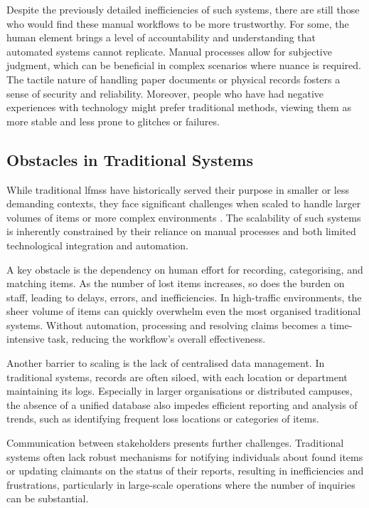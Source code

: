 Despite the previously detailed inefficiencies of such systems, there are still those who would find these manual workflows to be more trustworthy. For some, the human element brings a level of accountability and understanding that automated systems cannot replicate. Manual processes allow for subjective judgment, which can be beneficial in complex scenarios where nuance is required. The tactile nature of handling paper documents or physical records fosters a sense of security and reliability. Moreover, people who have had negative experiences with technology might prefer traditional methods, viewing them as more stable and less prone to glitches or failures.


\subsection{Obstacles in Traditional Systems} \label{subsec:obstacles-traditional-systems}

While traditional \acp{lfms} have historically served their purpose in smaller or less demanding contexts, they face significant challenges when scaled to handle larger volumes of items or more complex environments \cite{Mayura2024}. The scalability of such systems is inherently constrained by their reliance on manual processes and both limited technological integration and automation.

A key obstacle is the dependency on human effort for recording, categorising, and matching items. As the number of lost items increases, so does the burden on staff, leading to delays, errors, and inefficiencies. In high-traffic environments, the sheer volume of items can quickly overwhelm even the most organised traditional systems. Without automation, processing and resolving claims becomes a time-intensive task, reducing the workflow's overall effectiveness. 

Another barrier to scaling is the lack of centralised data management. In traditional systems, records are often siloed, with each location or department maintaining its logs. Especially in larger organisations or distributed campuses, the absence of a unified database also impedes efficient reporting and analysis of trends, such as identifying frequent loss locations or categories of items.

Communication between stakeholders presents further challenges. Traditional systems often lack robust mechanisms for notifying individuals about found items or updating claimants on the status of their reports, resulting in inefficiencies and frustrations, particularly in large-scale operations where the number of inquiries can be substantial.

